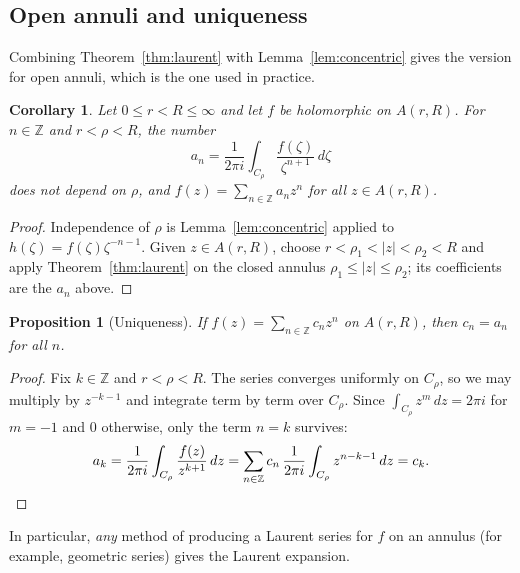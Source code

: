 \documentclass[11pt]{article}
\theoremstyle{plain}
\newtheorem{proposition}[theorem]{Proposition}
\newtheorem{corollary}[theorem]{Corollary}
\theoremstyle{definition}
\theoremstyle{boldremark}
\theoremstyle{remark}
\numberwithin{equation}{section}
\newcommand{\Z}{\mathbb{Z}}
\newenvironment{lecturefigure}
 {\par\addvspace{0.25em}\begingroup\setlength{\parskip}{0pt}\centering}
 {\par\endgroup\addvspace{0.25em}}
\begin{document}
\begin{lecturefigure}
\end{lecturefigure}

\subsection{Open annuli and uniqueness}
Combining Theorem~\ref{thm:laurent} with Lemma~\ref{lem:concentric} gives
the version for open annuli, which is the one used in practice.

\begin{corollary}\label{cor:open-annulus}
Let $0\leq r<R\leq\infty$ and let $f$ be holomorphic on $A(r,R)$. For
$n\in\Z$ and $r<\rho<R$, the number
\[
 a_n=\frac{1}{2\pi i}\int_{C_\rho}\frac{f(\zeta)}{\zeta^{n+1}}\,d\zeta
\]
does not depend on $\rho$, and $f(z)=\sum_{n\in\Z}a_nz^n$ for all
$z\in A(r,R)$.
\end{corollary}
\begin{proof}
Independence of $\rho$ is Lemma~\ref{lem:concentric} applied to
$h(\zeta)=f(\zeta)\zeta^{-n-1}$. Given $z\in A(r,R)$, choose
$r<\rho_1<|z|<\rho_2<R$ and apply Theorem~\ref{thm:laurent} on the closed
annulus $\rho_1\leq|z|\leq\rho_2$; its coefficients are the $a_n$ above.
\end{proof}

\begin{proposition}[Uniqueness]\label{prop:unique}
If $f(z)=\sum_{n\in\Z}c_nz^n$ on $A(r,R)$, then $c_n=a_n$ for all $n$.
\end{proposition}
\begin{proof}
Fix $k\in\Z$ and $r<\rho<R$. The series converges uniformly on $C_\rho$,
so we may multiply by $z^{-k-1}$ and integrate term by term over $C_\rho$.
Since $\int_{C_\rho}z^{m}\,dz=2\pi i$ for $m=-1$ and $0$ otherwise, only
the term $n=k$ survives:
\[
 a_k=\frac{1}{2\pi i}\int_{C_\rho}\frac{f(z)}{z^{k+1}}\,dz
 =\sum_{n\in\Z}c_n\,\frac{1}{2\pi i}\int_{C_\rho}z^{n-k-1}\,dz=c_k.\qedhere
\]
\end{proof}
In particular, \emph{any} method of producing a Laurent series for $f$
on an annulus (for example, geometric series) gives the Laurent expansion.
\end{document}
